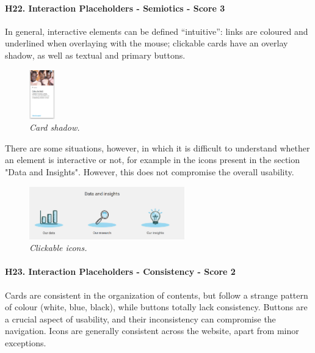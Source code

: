 \paragraph*{H22. Interaction Placeholders - Semiotics  - Score 3}
In general, interactive elements can be defined “intuitive”: links are coloured and underlined when overlaying with the mouse; clickable cards have an overlay shadow, as well as textual and primary buttons. 

\begin{figure}[h]
	\centering
	\begin{center}
		\includegraphics[width=0.1\textwidth]{Picture24.png}
	\end{center}
	\captionsetup{font=small}
	\caption{\textit{Card shadow.}}
	\label{fig:label23}
\end{figure}

There are some situations, however, in which it is difficult to understand whether an element is interactive or not, for example in the icons present in the section "Data and Insights". However, this does not compromise the overall usability.

\begin{figure}[h]
	\centering
	\begin{center}
		\includegraphics[width=0.6\textwidth]{Picture23.png}
	\end{center}
	\captionsetup{font=small}
	\caption{\textit{Clickable icons.}}
	\label{fig:label23}
\end{figure}

\newpage

\paragraph*{H23. Interaction Placeholders - Consistency  - Score 2}
Cards are consistent in the organization of contents, but follow a strange pattern of colour (white, blue, black), while buttons totally lack consistency. Buttons are a crucial aspect of usability, and their inconsistency can compromise the navigation.
Icons are generally consistent across the website, apart from minor exceptions.

